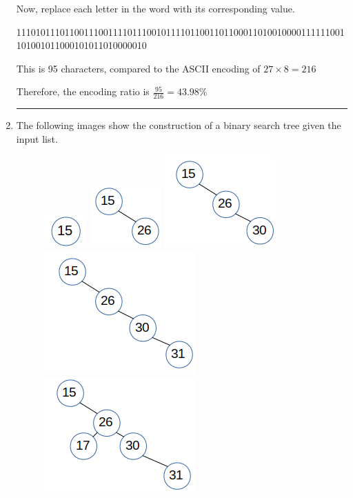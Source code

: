 \documentclass{article}
\begin{document}
\begin{enumerate}
Now, replace each letter in the word with its corresponding value. 

11101011101100111001111011100101111011001101100011010010000111111001101001011000101011010000010

This is 95 characters, compared to the ASCII encoding of $27 \times 8 = 216$ 

Therefore, the encoding ratio is $\frac{95}{216} = 43.98\%$

\noindent\rule{8cm}{0.4pt}


\item 
The following images show the construction of a binary search tree given the input list. 

\begin{figure}[H]
	\includegraphics[]{P10/0-15}
	\includegraphics[]{P10/1-26}
	\includegraphics[]{P10/2-30}
	\includegraphics[]{P10/3-31}
	\includegraphics[]{P10/4-17}

\end{figure}
\end{enumerate}
\end{document}
